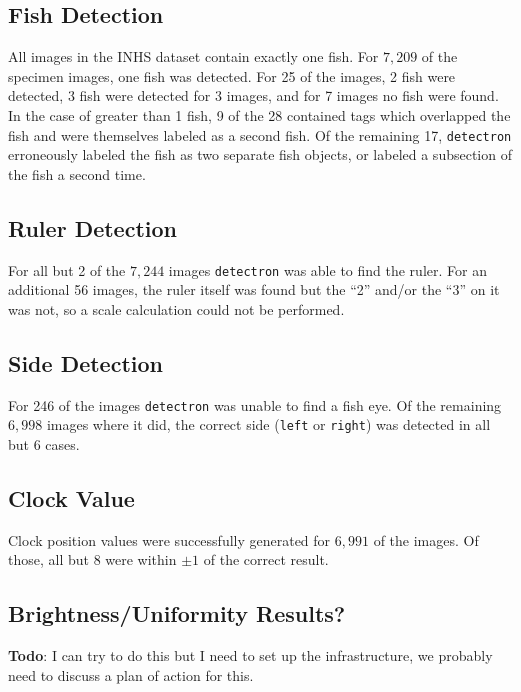 \documentclass[screen,review]{acmart}
\begin{document}
\subsection{Fish Detection}
All images in the INHS dataset contain exactly one fish. For \(7,209\) of the specimen images, one fish was detected. For 25 of the images, 2 fish were detected, 3 fish were detected for 3 images, and for 7 images no fish were found. In the case of greater than 1 fish, 9 of the 28 contained tags which overlapped the fish and were themselves labeled as a second fish. Of the remaining 17, \verb|detectron| erroneously labeled the fish as two separate fish objects, or labeled a subsection of the fish a second time.

\subsection{Ruler Detection}
For all but 2 of the \(7,244\) images \verb|detectron| was able to find the ruler. For an additional 56 images, the ruler itself was found but the ``2'' and/or the ``3'' on it was not, so a scale calculation could not be performed.

\subsection{Side Detection}
For 246 of the images \verb|detectron| was unable to find a fish eye. Of the remaining \(6,998\) images where it did, the correct side (\verb|left| or \verb|right|) was detected in all but 6 cases.

\subsection{Clock Value}
Clock position values were successfully generated for \(6,991\) of the images. Of those, all but 8 were within \(\pm{}1\) of the correct result.

\subsection{Brightness/Uniformity Results?}
\textbf{Todo}: I can try to do this but I need to set up the infrastructure, we probably need to discuss a plan of action for this.
\end{document}
